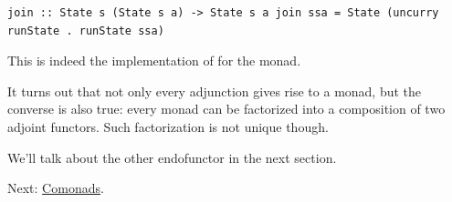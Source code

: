 \begin{verbatim}
join :: State s (State s a) -> State s a join ssa = State (uncurry runState . runState ssa)
\end{verbatim}

This is indeed the implementation of  for the
 monad.

It turns out that not only every adjunction gives rise to a monad, but
the converse is also true: every monad can be factorized into a
composition of two adjoint functors. Such factorization is not unique
though.

We'll talk about the other endofunctor  in the next
section.

Next: \href{https://bartoszmilewski.com/2017/01/02/comonads/}{Comonads}.
